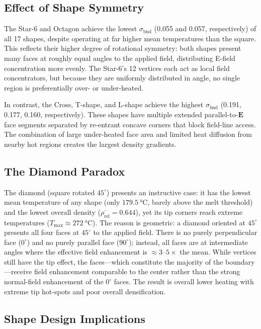 \documentclass[10pt,twocolumn]{article}
\newcommand{\bndstd}{\sigma_{\mathrm{bnd}}}
\newcommand{\rhorel}{\rho_{\mathrm{rel}}}
\newcommand{\vect}[1]{\boldsymbol{#1}}
\begin{document}
\subsection{Effect of Shape Symmetry}

The Star-6 and Octagon achieve the lowest $\bndstd$ (0.055 and 0.057,
respectively) of all 17 shapes, despite operating at far higher mean
temperatures than the square.  This reflects their higher degree of
rotational symmetry: both shapes present many faces at roughly equal
angles to the applied field, distributing E-field concentration more
evenly.  The Star-6's 12 vertices each act as local field concentrators,
but because they are uniformly distributed in angle, no single region
is preferentially over- or under-heated.

In contrast, the Cross, T-shape, and L-shape achieve the highest
$\bndstd$ (0.191, 0.177, 0.160, respectively).  These shapes have
multiple extended parallel-to-$\vect{E}$ face segments separated by
re-entrant concave corners that block field-line access.  The
combination of large under-heated face area and limited heat diffusion
from nearby hot regions creates the largest density gradients.

\subsection{The Diamond Paradox}

The diamond (square rotated $45^\circ$) presents an instructive
case: it has the lowest mean temperature of any shape (only
$\SI{179.5}{\celsius}$, barely above the melt threshold) and the
lowest overall density ($\bar{\rhorel} = 0.644$), yet its tip corners
reach extreme temperatures ($T_{\max} \approx \SI{272}{\celsius}$).
The reason is geometric: a diamond oriented at $45^\circ$ presents
all four faces at $45^\circ$ to the applied field.  There is no
purely perpendicular face ($0^\circ$) and no purely parallel face
($90^\circ$); instead, all faces are at intermediate angles where the
effective field enhancement is $\approx 3$--$5\times$ the mean.  While
vertices still have the tip effect, the faces---which constitute the
majority of the boundary---receive field enhancement comparable to the
center rather than the strong normal-field enhancement of the $0^\circ$
faces.  The result is overall lower heating with extreme tip hot-spots
and poor overall densification.

\subsection{Shape Design Implications}
\end{document}
